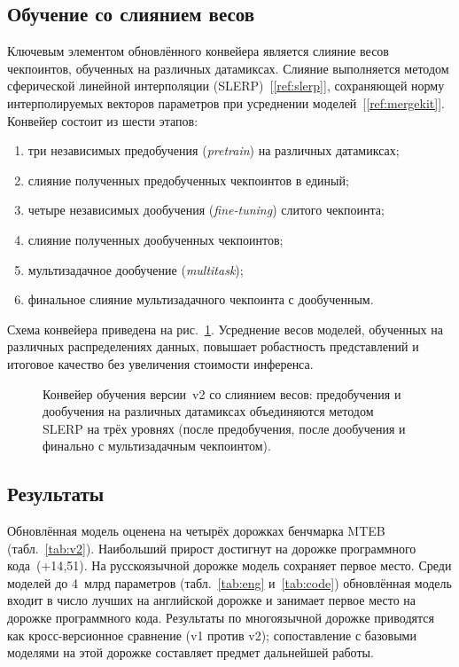 \documentclass[12pt,a4paper]{article}
\begin{document}
\subsection{Обучение со слиянием весов}
Ключевым элементом обновлённого конвейера является слияние весов чекпоинтов,
обученных на различных датамиксах. Слияние выполняется методом сферической
линейной интерполяции (SLERP)~[\ref{ref:slerp}], сохраняющей норму
интерполируемых векторов параметров при усреднении моделей~[\ref{ref:mergekit}].
Конвейер состоит из шести этапов:
\begin{enumerate}
  \item три независимых предобучения (\textit{pretrain}) на различных датамиксах;
  \item слияние полученных предобученных чекпоинтов в единый;
  \item четыре независимых дообучения (\textit{fine-tuning}) слитого чекпоинта;
  \item слияние полученных дообученных чекпоинтов;
  \item мультизадачное дообучение (\textit{multitask});
  \item финальное слияние мультизадачного чекпоинта с дообученным.
\end{enumerate}
Схема конвейера приведена на рис.~\ref{fig:merge}. Усреднение весов моделей,
обученных на различных распределениях данных, повышает робастность представлений
и итоговое качество без увеличения стоимости инференса.

\begin{figure}[ht]
  \centering
  \resizebox{\textwidth}{!}{%
    }
  \caption{Конвейер обучения версии~v2 со слиянием весов: предобучения и
  дообучения на различных датамиксах объединяются методом SLERP на трёх уровнях
  (после предобучения, после дообучения и финально с мультизадачным
  чекпоинтом).}\label{fig:merge}
\end{figure}

\subsection{Результаты}
Обновлённая модель оценена на четырёх дорожках бенчмарка MTEB
(табл.~\ref{tab:v2}). Наибольший прирост достигнут на дорожке программного
кода~(+14{,}51). На русскоязычной дорожке модель сохраняет первое место. Среди
моделей до 4~млрд параметров (табл.~\ref{tab:eng} и~\ref{tab:code}) обновлённая
модель входит в число лучших на английской дорожке и занимает первое место на
дорожке программного кода. Результаты по многоязычной дорожке приводятся как
кросс-версионное сравнение (v1 против v2); сопоставление с базовыми моделями на
этой дорожке составляет предмет дальнейшей работы.
\end{document}
